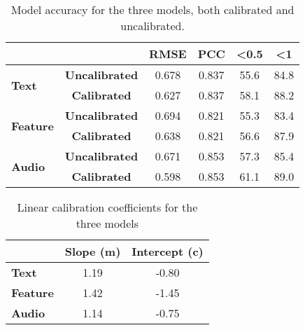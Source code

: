 \begin{table}[H]
    \centering
    \begin{tabular}{|l|c|c|c|c|c|}
        \hline
        \multicolumn{2}{|l|}{}                                  & \textbf{RMSE}         & \textbf{PCC} & \textbf{\textless 0.5} & \textbf{\textless 1}        \\ \hline
        \multicolumn{1}{|l|}{\multirow{2}{*}{\textbf{Text}}}    & \textbf{Uncalibrated} & 0.678        & 0.837                  & 55.6                 & 84.8 \\ \cline{2-6}
        \multicolumn{1}{|l|}{}                                  & \textbf{Calibrated}   & 0.627        & 0.837                  & 58.1                 & 88.2 \\ \hline
        \multicolumn{1}{|l|}{\multirow{2}{*}{\textbf{Feature}}} & \textbf{Uncalibrated} & 0.694        & 0.821                  & 55.3                 & 83.4 \\ \cline{2-6}
        \multicolumn{1}{|l|}{}                                  & \textbf{Calibrated}   & 0.638        & 0.821                  & 56.6                 & 87.9 \\ \hline
        \multicolumn{1}{|l|}{\multirow{2}{*}{\textbf{Audio}}}   & \textbf{Uncalibrated} & 0.671        & 0.853                  & 57.3                 & 85.4 \\ \cline{2-6}
        \multicolumn{1}{|l|}{}                                  & \textbf{Calibrated}   & 0.598        & 0.853                  & 61.1                 & 89.0 \\ \hline
    \end{tabular}
    \caption{Model accuracy for the three models, both calibrated and uncalibrated.}
    \label{tab:model_accuracy}
\end{table}

\begin{table}[H]
    \centering
    \begin{tabular}{|l|c|c|}
        \hline
        \textbf{}        & \textbf{Slope (m)} & \textbf{Intercept (c)} \\ \hline
        \textbf{Text}    & 1.19               & -0.80                  \\ \hline
        \textbf{Feature} & 1.42               & -1.45                  \\ \hline
        \textbf{Audio}   & 1.14               & -0.75                  \\ \hline
    \end{tabular}
    \caption{Linear calibration coefficients for the three models}
    \label{tab:linear_regression_coefficients}
\end{table}

